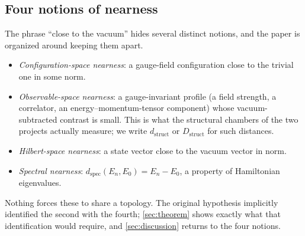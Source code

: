 \documentclass[11pt,a4paper]{article}
\theoremstyle{definition}
\theoremstyle{remark}
\newcommand{\Dstruct}{D_{\mathrm{struct}}}
\newcommand{\dstruct}{d_{\mathrm{struct}}}
\newcommand{\dspec}{d_{\mathrm{spec}}}
\begin{document}
\subsection{Four notions of nearness}
The phrase ``close to the vacuum'' hides several distinct notions, and the paper is organized around keeping them apart.
\begin{itemize}
\item \emph{Configuration-space nearness}: a gauge-field configuration close to the trivial one in some norm.
\item \emph{Observable-space nearness}: a gauge-invariant profile (a field strength, a correlator, an energy--momentum-tensor component) whose vacuum-subtracted contrast is small. This is what the structural chambers of the two projects actually measure; we write $\dstruct$ or $\Dstruct$ for such distances.
\item \emph{Hilbert-space nearness}: a state vector close to the vacuum vector in norm.
\item \emph{Spectral nearness}: $\dspec(E_n,E_0)=E_n-E_0$, a property of Hamiltonian eigenvalues.
\end{itemize}
Nothing forces these to share a topology. The original hypothesis implicitly identified the second with the fourth; \cref{sec:theorem} shows exactly what that identification would require, and \cref{sec:discussion} returns to the four notions.
\end{document}
